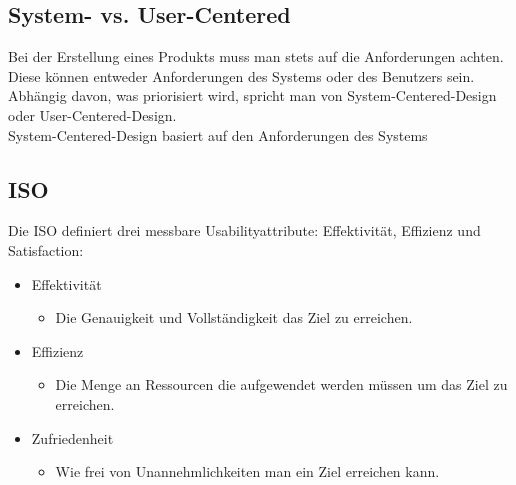 \documentclass{article}
\begin{document}
	\subsection{System- vs. User-Centered}
	Bei der Erstellung eines Produkts muss man stets auf die Anforderungen achten. Diese können entweder Anforderungen des Systems oder des Benutzers sein. Abhängig davon, was priorisiert wird, spricht man von System-Centered-Design oder User-Centered-Design. \\
	System-Centered-Design basiert auf den Anforderungen des Systems
	\subsection{ISO}
	Die ISO definiert drei messbare Usabilityattribute: Effektivität, Effizienz und Satisfaction:
	\begin{itemize}
		\item{Effektivität}
		\begin{itemize}
			\item{Die Genauigkeit und Vollständigkeit das Ziel zu erreichen.}
		\end{itemize}
		\item{Effizienz}
		\begin{itemize}
			\item{Die Menge an Ressourcen die aufgewendet werden müssen um das Ziel zu erreichen.}
		\end{itemize}
		\item{Zufriedenheit}
		\begin{itemize}
			\item{Wie frei von Unannehmlichkeiten man ein Ziel erreichen kann.}
		\end{itemize}
	\end{itemize}
\end{document}
